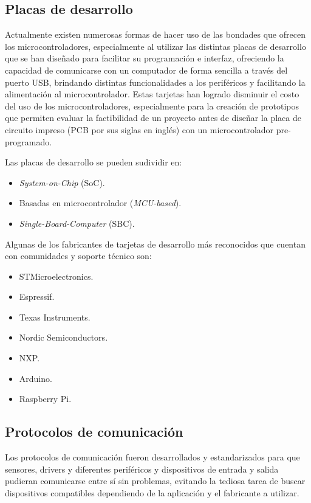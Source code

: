 \subsection{Placas de desarrollo}

Actualmente existen numerosas formas de hacer uso de las bondades que ofrecen los microcontroladores, especialmente al utilizar las distintas placas de desarrollo que se han diseñado para facilitar su programación e interfaz, ofreciendo la capacidad de comunicarse con un computador de forma sencilla a través del puerto USB, brindando distintas funcionalidades a los periféricos y facilitando la alimentación al microcontrolador. Estas tarjetas han logrado disminuir el costo del uso de los microcontroladores, especialmente para la creación de prototipos que permiten evaluar la factibilidad de un proyecto antes de diseñar la placa de circuito impreso (PCB por sus siglas en inglés) con un microcontrolador pre-programado.

Las placas de desarrollo se pueden sudividir en:


\begin{itemize}
    \item \textit{System-on-Chip} (SoC).
    \item Basadas en microcontrolador (\textit{MCU-based}).
    \item \textit{Single-Board-Computer} (SBC).
\end{itemize}
Algunas de los fabricantes de tarjetas de desarrollo más reconocidos que cuentan con comunidades y soporte técnico son:

\begin{itemize}
    \item STMicroelectronics.
    \item Espressif.
    \item Texas Instruments.
    \item Nordic Semiconductors.
    \item NXP.
    \item Arduino.
    \item Raspberry Pi.

\end{itemize}

\subsection{Protocolos de comunicación}

Los protocolos de comunicación fueron desarrollados y estandarizados para que sensores, drivers y diferentes periféricos y dispositivos de entrada y salida pudieran comunicarse entre sí sin problemas, evitando la tediosa tarea de buscar dispositivos compatibles dependiendo de la aplicación y el fabricante a utilizar. 

